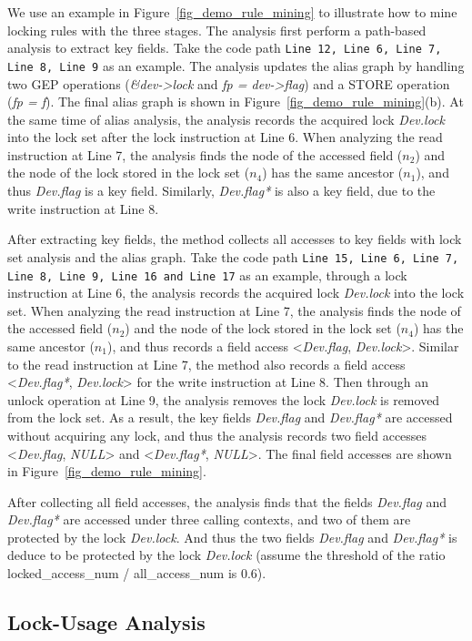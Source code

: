  We use an example in 
Figure~\ref{fig_demo_rule_mining} to illustrate how to mine locking rules 
with the three stages. The analysis first perform a path-based analysis to 
extract key fields. Take the code path {\tt Line 12, Line 6, Line 7, Line 8, 
Line 9} as an example. The analysis updates the alias graph by handling two GEP 
operations ({\em \&dev->lock} and {\em fp = dev->flag}) and a STORE operation 
({\em *fp = f}). The final alias graph is shown in 
Figure~\ref{fig_demo_rule_mining}(b). At the same time of alias analysis, the 
analysis records the acquired lock {\em Dev.lock} into the lock set after the 
lock instruction at Line 6. When analyzing the read instruction at Line 7, the 
analysis finds the node of the accessed field ($\mathit{n_2}$) and the node of 
the lock stored in the lock set ($\mathit{n_4}$) has the same ancestor 
($\mathit{n_1}$), and thus {\em Dev.flag} is a key field. Similarly, {\em 
Dev.flag*} is also a key field, due to the write instruction at Line 8. 

After extracting key fields, the method collects all accesses to key fields 
with lock set analysis and the alias graph. Take the code path {\tt Line 15, 
Line 6, Line 7, Line 8, Line 9, Line 16 and Line 17} as an example, through a 
lock instruction at Line 6, the analysis records the acquired lock {\em 
Dev.lock} into the lock set. When analyzing the read instruction at Line 7, the 
analysis finds the node of the accessed field ($\mathit{n_2}$) and the node of 
the lock stored in the lock set ($\mathit{n_4}$) has the same ancestor 
($\mathit{n_1}$), and thus records a field access <{\em Dev.flag}, {\em 
Dev.lock}>. Similar to the read instruction at Line 7, the method also records 
a field access <{\em Dev.flag*}, {\em Dev.lock}> for the write instruction at 
Line 8. Then through an unlock operation at Line 9, the analysis removes the 
lock {\em Dev.lock} is removed from the lock set. As a result, the key fields 
{\em Dev.flag} and {\em Dev.flag*} are accessed without acquiring any lock, and 
thus the analysis records two field accesses <{\em Dev.flag}, {\em NULL}> and 
<{\em Dev.flag*}, {\em NULL}>. The final field accesses are shown in 
Figure~\ref{fig_demo_rule_mining}.

After collecting all field accesses, the analysis finds that the fields {\em 
Dev.flag} and {\em Dev.flag*} are accessed under three calling contexts, and 
two of them are protected by the lock {\em Dev.lock}. And thus the two fields 
{\em Dev.flag} and {\em Dev.flag*} is deduce to be protected by the lock {\em 
Dev.lock} (assume the threshold of the ratio locked\_access\_num / 
all\_access\_num is 0.6).

\subsection{Lock-Usage Analysis}
\label{subsec_lock_usage_analysis}
